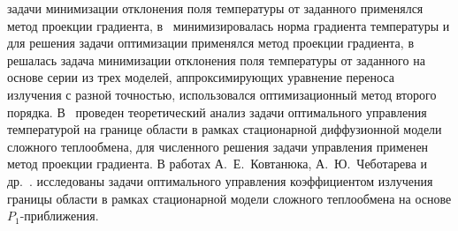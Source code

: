     задачи минимизации отклонения поля температуры от заданного применялся
    метод проекции градиента, в~\cite{clever2012optimal, Pinnau2004} минимизировалась норма градиента
    температуры и для решения задачи оптимизации применялся метод проекции
    градиента, в~\cite{clever2014model} решалась задача минимизации отклонения поля
    температуры от заданного на основе серии из трех моделей,
    аппроксимирующих уравнение переноса излучения с разной точностью,
    использовался оптимизационный метод второго порядка.
    В~\cite{Pinnau2004} проведен
    теоретический анализ задачи оптимального управления температурой на
    границе области в рамках стационарной диффузионной модели сложного
    теплообмена, для численного решения задачи управления применен метод
    проекции градиента.
    В работах А.\ Е.\ Ковтанюка, А.\ Ю.\ Чеботарева и др.\ \cite{Kovtanyuk2014,
        astrakhantseva2017design, Chebotarev2015,
        Kovtanyuk2014TheoreticalAnalysis, Chebotarev23nonhomogeneus, Chebotarev23optimal}.
    исследованы задачи оптимального
    управления коэффициентом излучения границы области в рамках
    стационарной модели сложного теплообмена на основе $P_1$-приближения.



